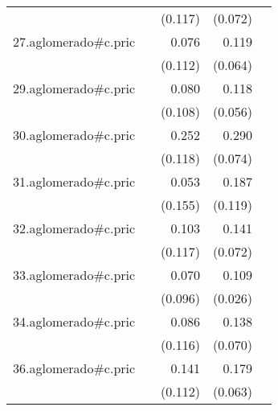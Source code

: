 {\begin{longtable}{l*{4}{D{.}{.}{-1}}}
            &                     &     (0.117)         &     (0.072)         &                     \\
\addlinespace
27.aglomerado#c.pric&                     &       0.076         &       0.119         &                     \\
            &                     &     (0.112)         &     (0.064)         &                     \\
\addlinespace
29.aglomerado#c.pric&                     &       0.080         &       0.118\sym{*}  &                     \\
            &                     &     (0.108)         &     (0.056)         &                     \\
\addlinespace
30.aglomerado#c.pric&                     &       0.252\sym{*}  &       0.290\sym{***}&                     \\
            &                     &     (0.118)         &     (0.074)         &                     \\
\addlinespace
31.aglomerado#c.pric&                     &       0.053         &       0.187         &                     \\
            &                     &     (0.155)         &     (0.119)         &                     \\
\addlinespace
32.aglomerado#c.pric&                     &       0.103         &       0.141         &                     \\
            &                     &     (0.117)         &     (0.072)         &                     \\
\addlinespace
33.aglomerado#c.pric&                     &       0.070         &       0.109\sym{***}&                     \\
            &                     &     (0.096)         &     (0.026)         &                     \\
\addlinespace
34.aglomerado#c.pric&                     &       0.086         &       0.138\sym{*}  &                     \\
            &                     &     (0.116)         &     (0.070)         &                     \\
\addlinespace
36.aglomerado#c.pric&                     &       0.141         &       0.179\sym{**} &                     \\
            &                     &     (0.112)         &     (0.063)         &                     \\

\end{longtable}}

